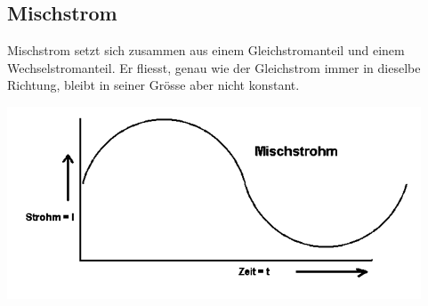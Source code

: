 \documentclass[11pt, a4paper, twoside, fleqn]{article}
\begin{document}
\subsection{Mischstrom}
\begin{flushleft}
Mischstrom setzt sich zusammen aus einem Gleichstromanteil und einem Wechselstromanteil. Er fliesst, genau wie der Gleichstrom immer in dieselbe Richtung, bleibt in seiner Grösse aber nicht konstant.
\end{flushleft}
\includegraphics[scale=0.6]{Misch_Strom}
\end{document}
